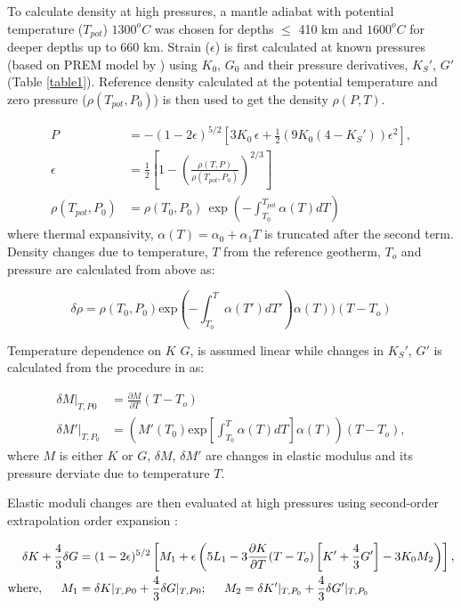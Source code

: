 \documentclass[draft,linenumbers]{agujournal2018}
\begin{document}
To calculate density at high pressures, a mantle adiabat with potential temperature ($T_{pot}$) $1300^o C$ was chosen for depths $\leq$ 410 km and $1600^o C $ for deeper depths up to 660 km. Strain ($\epsilon$) is first calculated at known pressures (based on PREM model by \citet{dziewonski1981preliminary}) using $K_0$, $G_0$ and their pressure derivatives, $K_S'$, $G'$  (Table \ref{table1}).  Reference density calculated at the potential temperature and zero pressure ($\rho(T_{pot}, P_0)$) is then used to get the density $\rho (P,T)$.

\begin{align*} 
    P &=  - (1 - 2\epsilon)^{5/2} \left[ 3K_0\, \epsilon + \frac{1}{2} \left( 9K_0 ( 4 - K_S' ) \right) \epsilon^2 \right], \\
    \epsilon &= \frac{1}{2} \left[ 1 - \left( \frac{\rho(T,P)}{\rho(T_{pot}, P_0)} \right) ^{2/3} \right] \\
    \rho(T_{pot}, P_0) &=  \rho(T_0, P_0) \, \exp \left( - \int_{T_0}^{T_{pot}} \alpha (T) dT \right)
\end{align*}
where thermal expansivity, $\alpha(T) = \alpha_0 + \alpha_1 T$ is truncated after the second term. Density changes due to temperature, $T$ from the reference geotherm, $T_o$ and pressure are calculated from above as:

\begin{equation}\label{den_der}
    \delta \rho = \rho(T_0, P_0) \text{exp} \left( - \int_{T_0}^{T} \alpha (T') dT' \right) \alpha(T) ) (T - T_o)
\end{equation}

Temperature dependence on $K$ $G$, is assumed linear while changes in $K_S'$, $G'$ is calculated from the procedure in \citep{duffy1989seismic} as: 

\begin{align*} 
    \delta M\vert_{T, P0} &= \frac{\partial M}{\partial T }  ( T - T_o )\\
    \delta M'\vert_{T, P_0} &=  \left( M'(T_0) \text{exp} \left[ \int_{T_0}^{T} \alpha (T) dT \right] \alpha(T) \right) ( T - T_o )  ,
\end{align*}
where $M$ is either $K$ or $G$, $\delta M$, $\delta M'$ are changes in elastic modulus and its  pressure derviate due to temperature $T$.

Elastic moduli changes are then evaluated at high pressures using second-order extrapolation order expansion \citep{duffy1989seismic}:

\begin{align} \label{M_der}
    \delta K + \frac{4}{3} \delta G &= ( 1 - 2 \epsilon)^{5/2} \left[ M_1 + \epsilon \left( 5 L_1 - 3 \frac{\partial K}{\partial T }  ( T - T_o ) \left[ K' + \frac{4}{3} G' \right] - 3K_0 M_2 \right)  \right], \\ 
    \text{where}, \hspace{0.5cm}
    M_1 &= \delta K\vert_{T, P0} + \frac{4}{3}\delta G\vert_{T, P0} ; \hspace{0.5cm}
    M_2 = \delta K'\vert_{T, P_0} + \frac{4}{3}\delta G'\vert_{T, P_0} \nonumber
\end{align}
\end{document}
